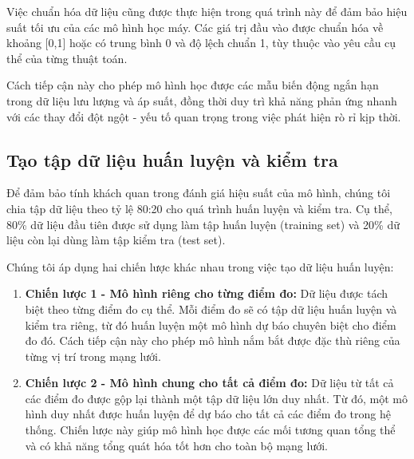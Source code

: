 Việc chuẩn hóa dữ liệu cũng được thực hiện trong quá trình này để đảm bảo hiệu suất tối ưu của các mô hình học máy. Các giá trị đầu vào được chuẩn hóa về khoảng [0,1] hoặc có trung bình 0 và độ lệch chuẩn 1, tùy thuộc vào yêu cầu cụ thể của từng thuật toán.

Cách tiếp cận này cho phép mô hình học được các mẫu biến động ngắn hạn trong dữ liệu lưu lượng và áp suất, đồng thời duy trì khả năng phản ứng nhanh với các thay đổi đột ngột - yếu tố quan trọng trong việc phát hiện rò rỉ kịp thời.

\subsection{Tạo tập dữ liệu huấn luyện và kiểm tra}

Để đảm bảo tính khách quan trong đánh giá hiệu suất của mô hình, chúng tôi chia tập dữ liệu theo tỷ lệ 80:20 cho quá trình huấn luyện và kiểm tra. Cụ thể, 80\% dữ liệu đầu tiên được sử dụng làm tập huấn luyện (training set) và 20\% dữ liệu còn lại dùng làm tập kiểm tra (test set).

Chúng tôi áp dụng hai chiến lược khác nhau trong việc tạo dữ liệu huấn luyện:

\begin{enumerate}
    \item \textbf{Chiến lược 1 - Mô hình riêng cho từng điểm đo:} Dữ liệu được tách biệt theo từng điểm đo cụ thể. Mỗi điểm đo sẽ có tập dữ liệu huấn luyện và kiểm tra riêng, từ đó huấn luyện một mô hình dự báo chuyên biệt cho điểm đo đó. Cách tiếp cận này cho phép mô hình nắm bắt được đặc thù riêng của từng vị trí trong mạng lưới.
    
    \item \textbf{Chiến lược 2 - Mô hình chung cho tất cả điểm đo:} Dữ liệu từ tất cả các điểm đo được gộp lại thành một tập dữ liệu lớn duy nhất. Từ đó, một mô hình duy nhất được huấn luyện để dự báo cho tất cả các điểm đo trong hệ thống. Chiến lược này giúp mô hình học được các mối tương quan tổng thể và có khả năng tổng quát hóa tốt hơn cho toàn bộ mạng lưới.
\end{enumerate}

